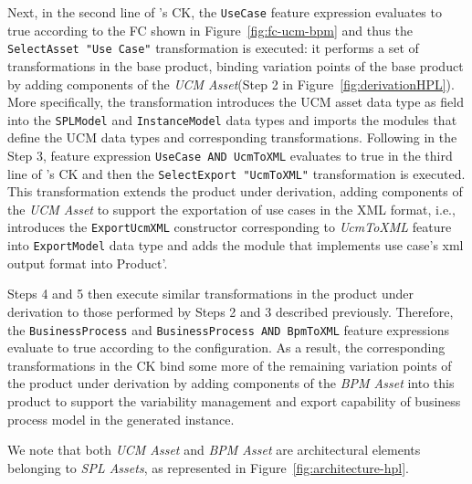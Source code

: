 %

Next, in the second line of \hpl's CK, the \texttt{UseCase} feature expression evaluates to true according to the FC shown in Figure~\ref{fig:fc-ucm-bpm} and thus the \texttt{SelectAsset "Use Case"} transformation is executed: it performs a set of transformations in the base product, binding variation points of the base product by adding components of the \textit{UCM Asset}(Step 2 in Figure~\ref{fig:derivationHPL}).  More specifically, the transformation introduces the UCM asset data type as field into the \texttt{SPLModel} and \texttt{InstanceModel} data types and imports the modules that define the UCM data types and corresponding transformations.  Following in the Step 3, feature expression \texttt{UseCase AND UcmToXML} evaluates to true in the third line of \hpl's CK and then the \texttt{SelectExport "UcmToXML"} transformation is executed. This transformation extends the product under derivation, adding components of the \textit{UCM Asset} to support the exportation of use cases in the XML format, i.e., introduces the \texttt{ExportUcmXML} constructor corresponding to \textit{UcmToXML} feature into \texttt{ExportModel} data type and adds the module that implements use case's xml output format into Product'.

Steps 4 and 5 then execute similar transformations in the product under derivation to those performed by Steps 2 and 3 described previously.  Therefore, the \texttt{BusinessProcess} and \texttt{BusinessProcess AND BpmToXML} feature expressions evaluate to true according to the configuration. As a result, the corresponding transformations in the CK bind some more of the remaining variation points of the product under derivation by adding components of the \textit{BPM Asset} into this product to support the variability management and export capability of business process model in the generated \hpl{} instance.

We note that both \textit{UCM Asset} and \textit{BPM Asset} are architectural elements belonging to \textit{SPL Assets}, as represented in Figure~\ref{fig:architecture-hpl}.


